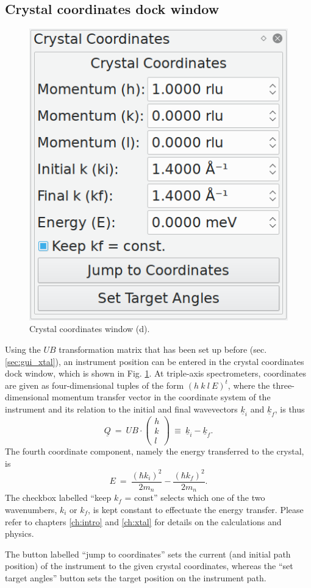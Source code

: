 \subsection{Crystal coordinates dock window}
\label{sec:gui_xtalcoords}
\begin{minipage}{1 \textwidth}
\setlength{\intextsep}{0.25cm}
\begin{figure}
	\vspace{-0.25cm}
	\includegraphics[width = 0.25 \textwidth]{figures/gui_xtalcoords}
	\caption[Crystal coordinates window]{Crystal coordinates window (d).
		\label{fig:gui_xtalcoords}}
\end{figure}

Using the $UB$ transformation matrix that has been set up before (sec. \ref{sec:gui_xtal}),
an instrument position can be entered in the crystal coordinates dock window, which is
shown in Fig. \ref{fig:gui_xtalcoords}.
At triple-axis spectrometers, coordinates are given as four-dimensional tuples of the
form $\left(h\  k\  l\  E \right)^t$, where the three-dimensional momentum transfer
vector in the coordinate system of the instrument and its relation to the initial and final
wavevectors $\underline{k}_i$ and $\underline{k}_f$, is thus \cite[p. 11]{Shirane2002} \cite{Lumsden2005}
\begin{equation}
	\underline{Q}\ =\ UB\cdot \left(\begin{array}{c} h \\ k \\ l \end{array}\right) \ \equiv\ \underline{k}_i - \underline{k}_f.
\end{equation}
The fourth coordinate component, namely the energy transferred to the crystal, is \cite[p. 11]{Shirane2002}
\begin{equation}
	E \ =\ \frac{\left( \hbar k_i \right)^2}{2 m_n} - \frac{\left( \hbar k_f \right)^2}{2 m_n}.
\end{equation}
The checkbox labelled ``keep $k_f$ = const'' selects which one of the two wavenumbers, $k_i$ or $k_f$,
is kept constant to effectuate the energy transfer.
Please refer to chapters \ref{ch:intro} and \ref{ch:xtal} for details on the calculations and physics.

The button labelled ``jump to coordinates'' sets the current (and initial path position)
of the instrument to the given crystal coordinates, whereas the ``set target angles'' button
sets the target position on the instrument path.

\end{minipage}



